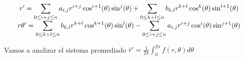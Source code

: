\documentclass[12pt, a4paper]{report}
\begin{document}
\begin{equation}
	\begin{matrix}
		r'=\displaystyle\large\sum_{0\leq i+j\leq n}a_{i,j}r^{i+j}\cos^{i+1}(\theta)\sin^j(\theta) +\displaystyle\large\sum_{0\leq k+l\leq n}b_{k,l}r^{k+l}\cos^k(\theta)\sin^{l+1}(\theta) \\
		r\theta' = \displaystyle\large\sum_{0\leq k+l\leq n}b_{k,l}r^{k+l}\cos^{k+1}(\theta)\sin^l(\theta)  -\displaystyle\large\sum_{0\leq i+j\leq n}a_{i,j}r^{i+j}\cos^i(\theta)\sin^{j+1}(\theta) 
	\end{matrix}
\end{equation}

Vamos a analizar el sistema promediado $\widehat{r}'=\frac{1}{2\pi}\displaystyle\int_{0}^{2\pi}f(r,\theta)d\theta $
\end{document}
